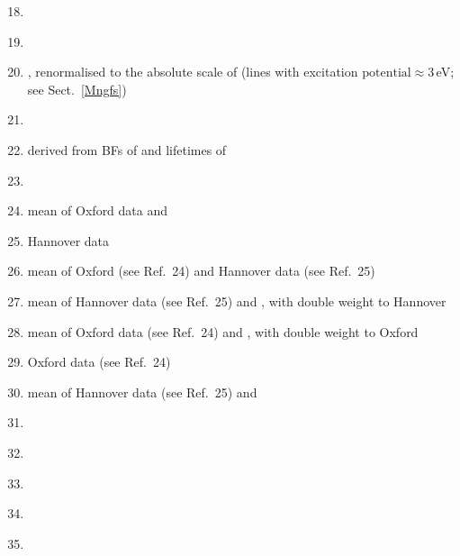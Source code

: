 \documentclass[traditabstract]{aa}
\begin{document}
\begin{minipage}[t]{0.43\linewidth}
\vspace{0pt}
\begin{enumerate}
\setcounter{enumi}{17}
\item\citet{Kuruczweb}
\item\citet{DenHartog11}
\item\citet{Booth84c}, renormalised to the absolute scale of \citet{BW07} (lines with excitation $\mathrm{potential}\approx3$\,eV; see Sect.~\protect\ref{Mngfs})
\item\citet{BW07}
\item derived from BFs of \citet{Greenlee79} and lifetimes of \citet{Schnabel95}
\item\citet{Booth84c}
\item mean of Oxford data \citep{Oxford1,Oxford2,Oxford3,Oxford4,Oxford5,Oxford6} and \citet{OBrian91}
\item Hannover data \citep{Bard91, Bard94}
\item mean of Oxford (see Ref.~24) and Hannover data (see Ref.~25)
\item mean of Hannover data (see Ref.~25) and \citet{OBrian91}, with double weight to Hannover
\item mean of Oxford data (see Ref.~24) and \citet{OBrian91}, with double weight to Oxford
\item Oxford data (see Ref.~24)
\item mean of Hannover data (see Ref.~25) and \citet{OBrian91}
\item\citet{Melendez09}
\item\citet{Cardon82}
\item\citet{Nitz99}
\item\citet{Wood14}
\item\citet{Johansson03}
\end{enumerate}
\end{minipage}
\vspace{6mm}
\end{document}

